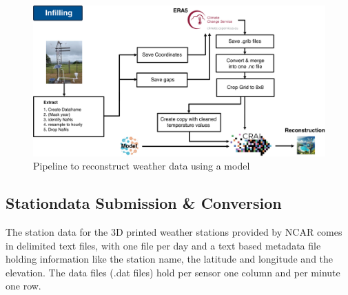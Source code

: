 \begin{figure}
    \centering
    \includegraphics[width=450pt]{resources/images/infilling_pipeline.png}
    \caption{Pipeline to reconstruct weather data using a model}
    \label{fig:training_pipeline}
\end{figure}

\subsection{Stationdata Submission \& Conversion}

The station data for the 3D printed weather stations provided by NCAR comes in delimited text files, with one file per day and a text based metadata file holding information like the station name, the latitude and longitude and the elevation.
The data files (.dat files) hold per sensor one column and per minute one row.

